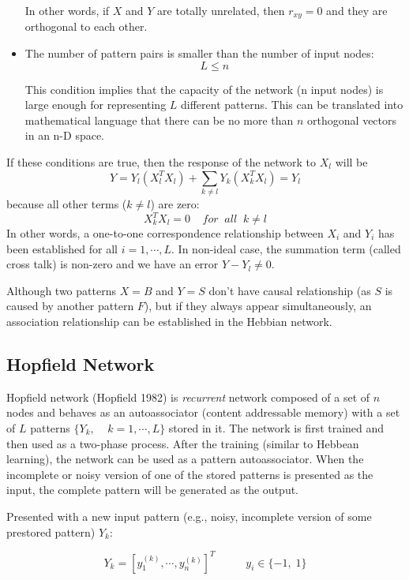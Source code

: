 \begin{itemize}
\vskip 0.3in

In other words, if $X$ and $Y$ are totally unrelated, then $r_{xy}=0$ and they
are orthogonal to each other.

\item The number of pattern pairs is smaller than the number of input nodes:
	\[	L \leq n	\]

This condition implies that the capacity of the network (n input nodes) 
is large enough for representing $L$ different patterns. This can be 
translated into mathematical language that there can be no more than $n$
orthogonal vectors in an n-D space. 

\end{itemize}

If these conditions are true, then the response of the network to $X_l$ will 
be 
\[ Y=Y_l(X_l^TX_l)+\sum_{k\neq l}Y_k(X_k^TX_l)=Y_l \]
because all other terms ($k \ne l$) are zero:
\[	X_k^T X_l=0\;\;\;\;for\;\;all\;\;k \neq l	\]
In other words, a one-to-one correspondence relationship between $X_i$ and 
$Y_i$ has been established for all $i=1,\cdots,L$.
In non-ideal case, the summation term (called cross talk) is non-zero and
we have an error $Y-Y_l \neq 0$.

Although two patterns $X=B$ and $Y=S$ don't have causal relationship (as $S$ is
caused by another pattern $F$), but if they always appear simultaneously,
an association relationship can be established in the Hebbian network.


\newpage
\subsection*{Hopfield Network}

Hopfield network (Hopfield 1982) is {\em recurrent} network composed of a 
set of $n$ nodes and behaves as an autoassociator (content addressable 
memory) with a set of $L$ patterns $\{ Y_k,\;\;\;\;k=1,\cdots,L\}$ stored 
in it. The network is first trained and then used as a two-phase process. 
After the training (similar to Hebbean learning), the network can be used 
as a pattern autoassociator. When the incomplete or noisy version of one 
of the stored patterns is presented as the input, the complete pattern will
be generated as the output.


Presented with a new input pattern (e.g., noisy, incomplete version of some 
prestored pattern) $Y_k$:

\[ Y_k=[y_1^{(k)},\cdots, y_n^{(k)}]^T\;\;\;\;\;\;\;\;\;\;y_i \in\{-1,\;1\} \]

